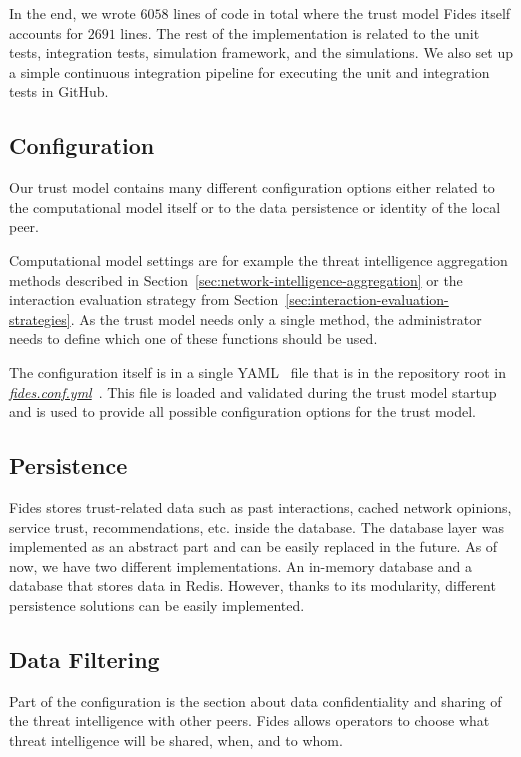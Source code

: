 In the end, we wrote $6058$ lines of code in total where the trust model Fides itself accounts for $2691$ lines. The rest of the implementation is related to the unit tests, integration tests, simulation framework, and the simulations.
We also set up a simple continuous integration pipeline for executing the unit and integration tests in GitHub.

\subsection{Configuration}
\label{subsec:configuration}
Our trust model contains many different configuration options either related to the computational model itself or to the data persistence or identity of the local peer.

Computational model settings are for example the threat intelligence aggregation methods described in Section~\ref{sec:network-intelligence-aggregation} or the interaction evaluation strategy from Section~\ref{sec:interaction-evaluation-strategies}.
As the trust model needs only a single method, the administrator needs to define which one of these functions should be used.

The configuration itself is in a single YAML~\cite{yaml} file that is in the repository root in \href{https://github.com/LukasForst/fides/blob/master/fides.conf.yml}{\textit{fides.conf.yml}}~\cite{fidesGithub}.
This file is loaded and validated during the trust model startup and is used to provide all possible configuration options for the trust model.

\subsection{Persistence}
\label{subsec:persistence}
Fides stores trust-related data such as past interactions, cached network opinions, service trust, recommendations, etc. inside the database.
The database layer was implemented as an abstract part and can be easily replaced in the future.
As of now, we have two different implementations. An in-memory database and a database that stores data in Redis.
However, thanks to its modularity, different persistence solutions can be easily implemented.

\subsection{Data Filtering}
\label{subsec:data-filtering}
Part of the configuration is the section about data confidentiality and sharing of the threat intelligence with other peers.
Fides allows operators to choose what threat intelligence will be shared, when, and to whom.

